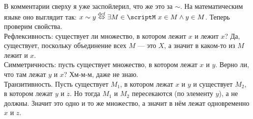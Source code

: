 \documentclass{article}
\begin{document}
\begin{itemize}
        \begin{Proof}
            В комментарии сверху я уже заспойлерил, что же это за $\sim$. На математическим языке оно выглядит так: $x\sim y\overset{\scriptstyle\mathrm{def}}\Leftrightarrow\exists M\in\scriptM~x\in M\land y\in M$. Теперь проверим свойства.\\
            Рефлексивность: существует ли множество, в котором лежит $x$ и лежит $x$? Да, существует, поскольку объединение всех $M$ --- это $X$, а значит в каком-то из $M$ лежит и $x$.\\
            Симметричность: пусть существует множество, в котором лежат $x$ и $y$. Верно ли, что там лежат $y$ и $x$? Хм-м-м, даже не знаю.\\
            Транзитивность. Пусть существует $M_1$, в котором лежат $x$ и $y$ и существует $M_2$, в котором лежат $y$ и $z$. Но тогда $M_1$ и $M_2$ пересекаются (по элементу $y$), а не должны. Значит это одно и то же множество, а значит в нём лежат одновременно $x$ и $z$.
        \end{Proof}
    \end{itemize}
\end{document}
